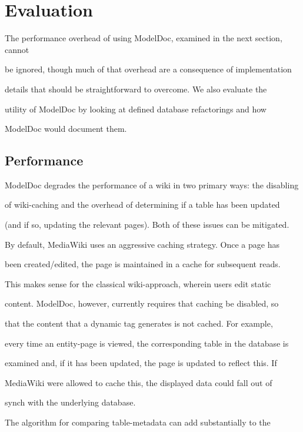 \documentclass{acm_proc_article-sp}
\begin{document}
\section{Evaluation}



The performance overhead of using ModelDoc, examined in the next section, cannot

be ignored, though much of that overhead are a consequence of implementation

details that should be straightforward to overcome.  We also evaluate the

utility of ModelDoc by looking at defined database refactorings and how

ModelDoc would document them.



\subsection{Performance}



ModelDoc degrades the performance of a wiki in two primary ways: the disabling

of wiki-caching and the overhead of determining if a table has been updated

(and if so, updating the relevant pages). Both of these issues can be mitigated.



By default, MediaWiki uses an aggressive caching strategy.  Once a page has

been created/edited, the page is maintained in a cache for subsequent reads. 

This makes sense for the classical wiki-approach, wherein users edit static

content.  ModelDoc, however, currently requires that caching be disabled, so

that the content that a dynamic tag generates is not cached.  For example,

every time an entity-page is viewed, the corresponding table in the database is

examined and, if it has been updated, the page is updated to reflect this.  If

MediaWiki were allowed to cache this, the displayed data could fall out of

synch with the underlying database.



The algorithm for comparing table-metadata can add substantially to the
\end{document}
